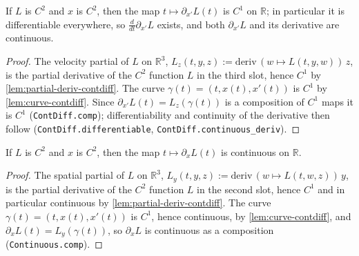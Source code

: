 \begin{lemma}
    \label{lem:partial-v-contdiff}
    \leanok
    If $L$ is $C^2$ and $x$ is $C^2$, then the map $t \mapsto \partial_{x'} L(t)$
    is $C^1$ on $\mathbb{R}$; in particular it is differentiable everywhere, so
    $\frac{d}{dt}\partial_{x'} L$ exists, and both $\partial_{x'} L$ and its
    derivative are continuous.
\end{lemma}
\begin{proof}
    The velocity partial of $L$ on $\mathbb{R}^3$,
    $L_z(t,y,z) := \mathrm{deriv}\,(w \mapsto L(t,y,w))\,z$, is the partial
    derivative of the $C^2$ function $L$ in the third slot, hence $C^1$ by
    \cref{lem:partial-deriv-contdiff}. The curve $\gamma(t) = (t, x(t), x'(t))$ is
    $C^1$ by \cref{lem:curve-contdiff}. Since $\partial_{x'} L(t) =
    L_z(\gamma(t))$ is a composition of $C^1$ maps it is $C^1$
    (\texttt{ContDiff.comp}); differentiability and continuity of the derivative
    then follow (\texttt{ContDiff.differentiable},
    \texttt{ContDiff.continuous\_deriv}).
\end{proof}

\begin{lemma}
    \label{lem:partial-x-continuous}
    \leanok
    If $L$ is $C^2$ and $x$ is $C^2$, then the map $t \mapsto \partial_x L(t)$ is
    continuous on $\mathbb{R}$.
\end{lemma}
\begin{proof}
    The spatial partial of $L$ on $\mathbb{R}^3$,
    $L_y(t,y,z) := \mathrm{deriv}\,(w \mapsto L(t,w,z))\,y$, is the partial
    derivative of the $C^2$ function $L$ in the second slot, hence $C^1$ and in
    particular continuous by \cref{lem:partial-deriv-contdiff}. The curve
    $\gamma(t) = (t,x(t),x'(t))$ is $C^1$, hence continuous, by
    \cref{lem:curve-contdiff}, and $\partial_x L(t) = L_y(\gamma(t))$, so
    $\partial_x L$ is continuous as a composition (\texttt{Continuous.comp}).
\end{proof}

